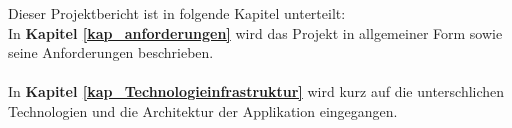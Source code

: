 Dieser Projektbericht ist in folgende Kapitel unterteilt:\\
In \textbf{Kapitel \ref{kap_anforderungen}} wird das Projekt in allgemeiner Form sowie seine Anforderungen beschrieben.
\\\\
In \textbf{Kapitel \ref{kap_Technologieinfrastruktur}} wird kurz auf die unterschlichen Technologien und die Architektur der Applikation eingegangen.
\\\\
